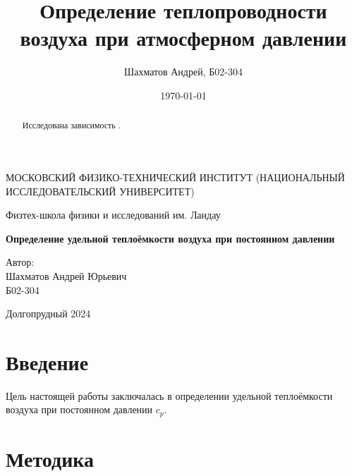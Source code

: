 \documentclass[12pt]{article}
\title{Определение теплопроводности воздуха при атмосферном давлении}
\author{Шахматов Андрей, Б02-304}
\date{\today}
\begin{document}
\begin{titlepage}
    \begin{center}
        {\large МОСКОВСКИЙ ФИЗИКО-ТЕХНИЧЕСКИЙ ИНСТИТУТ (НАЦИОНАЛЬНЫЙ ИССЛЕДОВАТЕЛЬСКИЙ УНИВЕРСИТЕТ)}
    \end{center}
    \begin{center}
        {\large Физтех-школа физики и исследований им. Ландау}
    \end{center}
    
    
    \vspace{3cm}
    {\huge
        \begin{center}
            \textbf{Определение удельной теплоёмкости воздуха при постоянном давлении}
        \end{center}
    }
    \vspace{2cm}
    \begin{flushright}
        {\LARGE Автор:\\ Шахматов Андрей Юрьевич \\
            \vspace{0.2cm}
            Б02-304}
    \end{flushright}
    \vspace{7 cm}
    \begin{center}
        Долгопрудный 2024
    \end{center}
\end{titlepage}


\begin{abstract}
    Исследована зависимость .
\end{abstract}

\tableofcontents

\section{Введение}
Цель настоящей работы заключалась в определении удельной теплоёмкости воздуха при постоянном давлении $c_p$.

\section{Методика}
\end{document}

